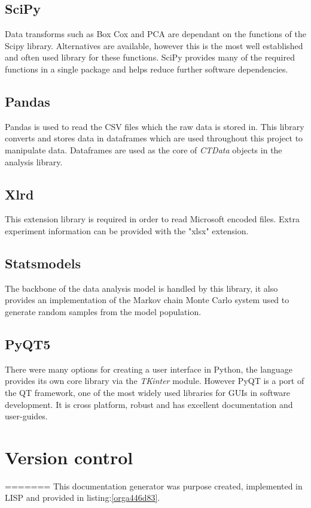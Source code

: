 \documentclass[11pt]{report}
\begin{document}
\subsection{SciPy}
\label{sec:org8fa5785}
Data transforms such as Box Cox and PCA are dependant on the functions of the Scipy library. Alternatives are available, however this is the most well established and often used library for these functions. SciPy provides many of the required functions in a single package and helps reduce further software dependencies.
\subsection{Pandas}
\label{sec:orgafd4b73}
Pandas is used to read the CSV files which the raw data is stored in. This library converts and stores data in dataframes which are used throughout this project to manipulate data. Dataframes are used as the core of \emph{CTData} objects in the analysis library.
\subsection{Xlrd}
\label{sec:org480a475}
This extension library is required in order to read Microsoft encoded files. Extra experiment information can be provided with the "xlsx" extension.
\subsection{Statsmodels}
\label{sec:org9bac95b}
The backbone of the data analysis model is handled by this library, it also provides an implementation of the Markov chain Monte Carlo system used to generate random samples from the model population.
\subsection{PyQT5}
\label{sec:org861074e}
There were many options for creating a user interface in Python, the language provides its own core library via the \emph{TKinter} module. However PyQT is a port of the QT framework, one of the most widely used libraries for GUIs in software development. It is cross platform, robust and has excellent documentation and user-guides.

\section{Version control}
\label{sec:orge097543}
=======
This documentation generator was purpose created, implemented in LISP and provided in listing:\ref{orga446d83}.
\end{document}
